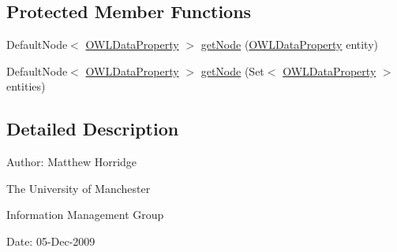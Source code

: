 \subsection*{Protected Member Functions}
\begin{DoxyCompactItemize}
\item 
Default\-Node$<$ \hyperlink{interfaceorg_1_1semanticweb_1_1owlapi_1_1model_1_1_o_w_l_data_property}{O\-W\-L\-Data\-Property} $>$ \hyperlink{classorg_1_1semanticweb_1_1owlapi_1_1reasoner_1_1impl_1_1_o_w_l_data_property_node_set_a94f41b1956ac3ac0b194e977ea375503}{get\-Node} (\hyperlink{interfaceorg_1_1semanticweb_1_1owlapi_1_1model_1_1_o_w_l_data_property}{O\-W\-L\-Data\-Property} entity)
\item 
Default\-Node$<$ \hyperlink{interfaceorg_1_1semanticweb_1_1owlapi_1_1model_1_1_o_w_l_data_property}{O\-W\-L\-Data\-Property} $>$ \hyperlink{classorg_1_1semanticweb_1_1owlapi_1_1reasoner_1_1impl_1_1_o_w_l_data_property_node_set_a862b4d385a8c68ffcaace6e35c53a7c2}{get\-Node} (Set$<$ \hyperlink{interfaceorg_1_1semanticweb_1_1owlapi_1_1model_1_1_o_w_l_data_property}{O\-W\-L\-Data\-Property} $>$ entities)
\end{DoxyCompactItemize}


\subsection{Detailed Description}
Author\-: Matthew Horridge\par
 The University of Manchester\par
 Information Management Group\par
 Date\-: 05-\/\-Dec-\/2009 

